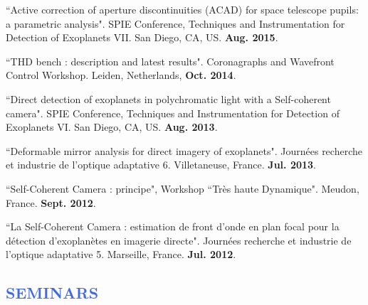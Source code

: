 \documentclass[12pt]{article}
\begin{document}
\begin{etaremune}
\item ``Active correction of aperture discontinuities (ACAD) for space telescope pupils: a parametric analysis". SPIE Conference, Techniques and Instrumentation for Detection of Exoplanets VII. San Diego, CA, US. \textbf{Aug. 2015}.

\item ``THD bench : description and latest results". Coronagraphs and Wavefront Control Workshop. Leiden, Netherlands, \textbf{Oct. 2014}.

\item ``Direct detection of exoplanets in polychromatic light with a Self-coherent camera". SPIE Conference, Techniques and Instrumentation for Detection of Exoplanets VI. San Diego, CA, US. \textbf{Aug. 2013}.

\item ``Deformable mirror analysis for direct imagery of exoplanets". Journées recherche et industrie de l’optique adaptative 6. Villetaneuse, France. \textbf{Jul. 2013}.

\item ``Self-Coherent Camera : principe", Workshop ``Très haute Dynamique". Meudon, France. \textbf{Sept. 2012}.

\item ``La Self-Coherent Camera : estimation de front d'onde en plan focal pour la détection d'exoplanètes en imagerie directe". Journées recherche et industrie de l'optique adaptative 5. Marseille, France. \textbf{Jul. 2012}.
\end{etaremune}

\vspace{-0.8cm}
\textcolor{RoyalBlue}{\subsection{SEMINARS}}
\end{document}
